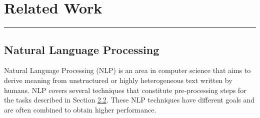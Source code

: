\hypertarget{2}{}

\chapter{Related Work}


\vspace{-1.6cm}

\begingroup
\color{gray}
\par\noindent\rule{\textwidth}{0.4pt}
\endgroup



\hypertarget{2.1}{\section{Natural Language Processing}}

Natural Language Processing (NLP) is an area in computer science that aims to derive meaning from unstructured or highly heterogeneous text written by humans. NLP covers several techniques that constitute pre-processing steps for the tasks described in Section \hyperlink{2.2}{2.2}. These NLP techniques have different goals and are often combined to obtain higher performance.


